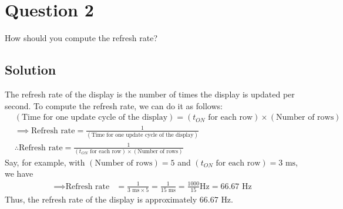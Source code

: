 \section*{Question 2}

How should you compute the refresh rate?

\subsection*{Solution}

The refresh rate of the display is the number of times the display is updated per second.
To compute the refresh rate, we can do it as follows:
\begin{align*}
     &
    (\text{Time for one update cycle of the display})
    =
    (t_{ON} \text{ for each row})
    \times
    (\text{Number of rows})
    \\ &
    \implies
    \text{Refresh rate}
    =
    \frac{1}{
        (\text{Time for one update cycle of the display})
    }
    \\ &
    \therefore
    \boxed{
        \text{Refresh rate}
        =
        \frac{1}{
            (t_{ON} \text{ for each row})
            \times
            (\text{Number of rows})
        }
    }
\end{align*}
Say, for example, with \( (\text{Number of rows}) = 5 \) and \( (t_{ON} \text{ for each row}) = 3 \text{ ms} \), we have
\begin{align*}
    \implies
    \text{Refresh rate}
     & =
    \frac{1}{3 \text{ ms} \times 5}
    =
    \frac{1}{15 \text{ ms}}
    =
    \frac{1000}{15} \text{Hz}
    =
    66.67 \text{ Hz}
\end{align*}
Thus, the refresh rate of the display is approximately \( 66.67 \text{ Hz} \).
